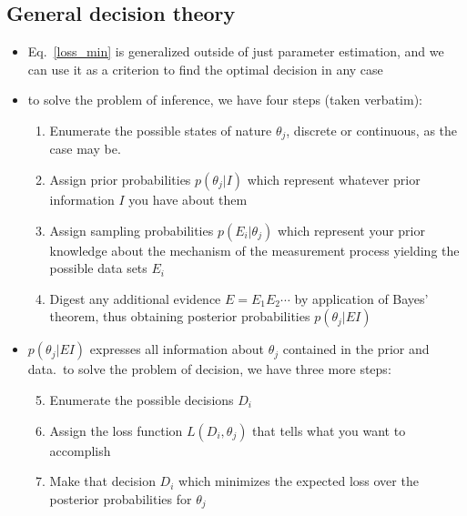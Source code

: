 \documentclass[../jaynes_prob_theory_notes.tex]{subfiles}
\begin{document}
        \subsection{General decision theory}
            \begin{itemize} 
                \item Eq.~\ref{loss_min} is generalized outside of just parameter estimation, and we can use it as a criterion to find the optimal decision in any case
                \item to solve the problem of inference, we have four steps (taken verbatim):
                    \begin{enumerate}
                        \item Enumerate the possible states of nature \(\theta_j\), discrete or continuous, as the case may be.
                        \item Assign prior probabilities \(p(\theta_j|I)\) which represent whatever prior information \(I\) you have about them
                        \item Assign sampling probabilities \(p(E_i|\theta_j)\) which represent your prior knowledge about the mechanism of the measurement process yielding the possible data sets \(E_i\)
                        \item Digest any additional evidence \(E = E_1E_2\cdots\) by application of Bayes' theorem, thus obtaining posterior probabilities \(p(\theta_j|EI)\)
                    \end{enumerate}
                \item \(p(\theta_j|EI)\) expresses all information about \(\theta_j\) contained in the prior and data.\ to solve the problem of decision, we have three more steps:
                    \begin{enumerate}
                        \setcounter{enumi}{4}
                        \item Enumerate the possible decisions \(D_i\)
                        \item Assign the loss function \(L(D_i, \theta_j)\) that tells what you want to accomplish
                        \item Make that decision \(D_i\) which minimizes the expected loss over the posterior probabilities for \(\theta_j\)
                    \end{enumerate}
            \end{itemize}
\end{document}
